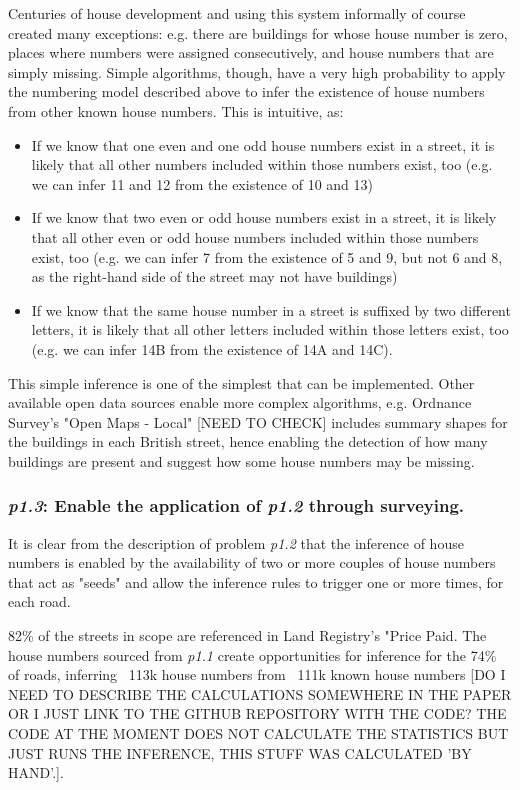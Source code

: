         Centuries of house development and using this system informally of course created many exceptions: e.g. there are buildings for whose house number is zero, places where numbers were assigned consecutively, and house numbers that are simply missing. Simple algorithms, though, have a very high probability to apply the numbering model described above to infer the existence of house numbers from other known house numbers. This is intuitive, as: 
        \begin{itemize}
            \item If we know that one even and one odd house numbers exist in a street, it is likely that all other numbers included within those numbers exist, too (e.g. we can infer 11 and 12 from the existence of 10 and 13)
            \item If we know that two even or odd house numbers exist in a street, it is likely that all other even or odd house numbers included within those numbers exist, too (e.g. we can infer 7 from the existence of 5 and 9, but not 6 and 8, as the right-hand side of the street may not have buildings)
            \item If we know that the same house number in a street is suffixed by two different letters, it is likely that all other letters included within those letters exist, too (e.g. we can infer 14B from the existence of 14A and 14C).
        \end{itemize}
        
        This simple inference is one of the simplest that can be implemented. Other available open data sources enable more complex algorithms, e.g. Ordnance Survey's "Open Maps - Local" [NEED TO CHECK] includes summary shapes for the buildings in each British street, hence enabling the detection of how many buildings are present and suggest how some house numbers may be missing.
        
    \subsubsection{{\it p1.3}: Enable the application of {\it p1.2} through surveying.} 

        It is clear from the description of problem {\it p1.2} that the inference of house numbers is enabled by the availability of two or more couples of house numbers that act as "seeds" and allow the inference rules to trigger one or more times, for each road.
        
        82\% of the streets in scope are referenced in Land Registry's "Price Paid. The house numbers sourced from {\it p1.1} create opportunities for inference for the 74\% of roads, inferring ~113k house numbers from ~111k known house numbers [DO I NEED TO DESCRIBE THE CALCULATIONS SOMEWHERE IN THE PAPER OR I JUST LINK TO THE GITHUB REPOSITORY WITH THE CODE? THE CODE AT THE MOMENT DOES NOT CALCULATE THE STATISTICS BUT JUST RUNS THE INFERENCE, THIS STUFF WAS CALCULATED 'BY HAND'.].  
        
